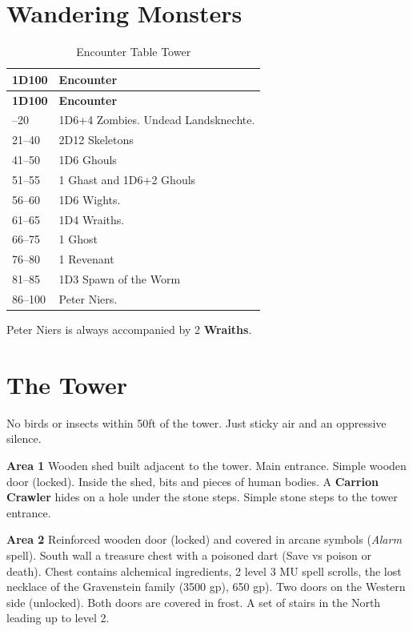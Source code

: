 \documentclass[
]{book}
\begin{document}
\section{Wandering Monsters}\label{wandering-monsters}

\begin{longtable}[]{@{}ll@{}}
\caption{Encounter Table Tower}\tabularnewline
\toprule\noalign{}
\textbf{1D100} & \textbf{Encounter} \\
\midrule\noalign{}
\endfirsthead
\toprule\noalign{}
\textbf{1D100} & \textbf{Encounter} \\
\midrule\noalign{}
\endhead
\bottomrule\noalign{}
\endlastfoot
1--20 & 1D6+4 Zombies. Undead Landsknechte. \\
21--40 & 2D12 Skeletons \\
41--50 & 1D6 Ghouls \\
51--55 & 1 Ghast and 1D6+2 Ghouls \\
56--60 & 1D6 Wights. \\
61--65 & 1D4 Wraiths. \\
66--75 & 1 Ghost \\
76--80 & 1 Revenant \\
81--85 & 1D3 Spawn of the Worm \\
86--100 & Peter Niers. \\
\end{longtable}

Peter Niers is always accompanied by 2 \textbf{Wraiths}.

\section{The Tower}\label{the-tower}

No birds or insects within 50ft of the tower. Just sticky air and an oppressive silence.

\textbf{Area 1}
Wooden shed built adjacent to the tower. Main entrance. Simple wooden door (locked). Inside the shed, bits and pieces of human bodies. A \textbf{Carrion Crawler} hides on a hole under the stone steps. Simple stone steps to the tower entrance.

\textbf{Area 2}
Reinforced wooden door (locked) and covered in arcane symbols (\emph{Alarm} spell). South wall a treasure chest with a poisoned dart (Save vs poison or death). Chest contains alchemical ingredients, 2 level 3 MU spell scrolls, the lost necklace of the Gravenstein family (3500 gp), 650 gp). Two doors on the Western side (unlocked). Both doors are covered in frost. A set of stairs in the North leading up to level 2.
\end{document}
